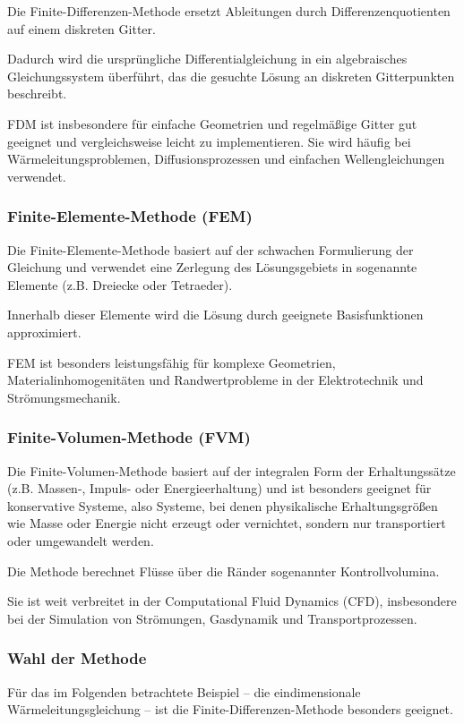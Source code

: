 Die Finite-Differenzen-Methode ersetzt Ableitungen durch Differenzenquotienten auf einem diskreten Gitter.

Dadurch wird die ursprüngliche Differentialgleichung in ein algebraisches Gleichungssystem überführt, das die gesuchte Lösung an diskreten Gitterpunkten beschreibt.

FDM ist insbesondere für einfache Geometrien und regelmäßige Gitter gut geeignet und vergleichsweise leicht zu implementieren.
Sie wird häufig bei Wärmeleitungsproblemen, Diffusionsprozessen und einfachen Wellengleichungen verwendet.

\subsubsection{Finite-Elemente-Methode (FEM)}

Die Finite-Elemente-Methode basiert auf der schwachen Formulierung der Gleichung und verwendet eine Zerlegung des Lösungsgebiets in sogenannte Elemente (z.B. Dreiecke oder Tetraeder).

Innerhalb dieser Elemente wird die Lösung durch geeignete Basisfunktionen approximiert.

FEM ist besonders leistungsfähig für komplexe Geometrien, Materialinhomogenitäten und Randwertprobleme in der Elektrotechnik und Strömungsmechanik.

\subsubsection{Finite-Volumen-Methode (FVM)}

Die Finite-Volumen-Methode basiert auf der integralen Form der Erhaltungssätze (z.B. Massen-, Impuls- oder Energieerhaltung) und ist besonders geeignet für konservative Systeme, also Systeme, bei denen physikalische Erhaltungsgrößen wie Masse oder Energie nicht erzeugt oder vernichtet, sondern nur transportiert oder umgewandelt werden.

Die Methode berechnet Flüsse über die Ränder sogenannter Kontrollvolumina.

Sie ist weit verbreitet in der Computational Fluid Dynamics (CFD), insbesondere bei der Simulation von Strömungen, Gasdynamik und Transportprozessen.

\subsubsection{Wahl der Methode}

Für das im Folgenden betrachtete Beispiel – die eindimensionale Wärmeleitungsgleichung – ist die Finite-Differenzen-Methode besonders geeignet.

